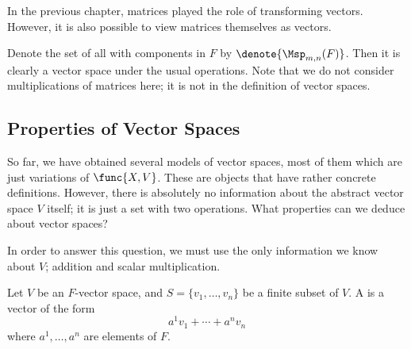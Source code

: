 \begin{example}
    \label{exm:vspmat}
    In the previous chapter,
    matrices played the role of transforming vectors.
    However, it is also possible to view matrices themselves as vectors.

    Denote the set of all  with components in \(F\)
    by \(\denote{\Msp_{m,n}(F)}\).
    Then it is clearly a vector space under the usual operations.
    Note that we do not consider multiplications of matrices here;
    it is not in the definition of vector spaces.
\end{example}

\subsection[Properties]{Properties of Vector Spaces}
\label{sbc:vspprop}

So far, we have obtained several models of vector spaces,
most of them which are just variations of \(\func{X,V}\).
These are objects that have rather concrete definitions.
However, there is absolutely no information
about the abstract vector space \(V\) itself;
it is just a set with two operations.
What properties can we deduce about vector spaces?

In order to answer this question,
we must use the only information we know about \(V\);
addition and scalar multiplication.

\begin{definition*}
    \label{def:lincombi}
    Let \(V\) be an \(F\)-vector space,
    and \(S=\{v_1,\dots,v_n\}\) be a finite subset of \(V\).
    A 
    is a vector of the form
    \[
        a^1v_1+\cdots+a^nv_n
    \]
    where \(a^1,\dots,a^n\) are elements of \(F\).
\end{definition*}